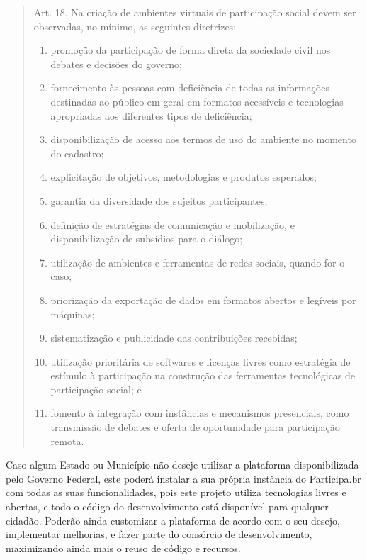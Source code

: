 \documentclass{article}
\begin{document}
\begin{quote}
Art. 18.  Na criação de ambientes virtuais de participação social devem ser
observadas, no mínimo, as seguintes diretrizes:

\begin{enumerate}
  \item promoção da participação de forma direta da sociedade civil nos debates e decisões do governo;
  \item fornecimento às pessoas com deficiência de todas as informações destinadas ao público em geral em formatos acessíveis e tecnologias apropriadas aos diferentes tipos de deficiência;
  \item disponibilização de acesso aos termos de uso do ambiente no momento do cadastro;
  \item explicitação de objetivos, metodologias e produtos esperados;
  \item garantia da diversidade dos sujeitos participantes;
  \item definição de estratégias de comunicação e mobilização, e disponibilização de subsídios para o diálogo;
  \item utilização de ambientes e ferramentas de redes sociais, quando for o caso;
  \item priorização da exportação de dados em formatos abertos e legíveis por máquinas;
  \item sistematização e publicidade das contribuições recebidas;
  \item utilização prioritária de softwares e licenças livres como estratégia de estímulo à participação na construção das ferramentas tecnológicas de participação social; e
  \item fomento à integração com instâncias e mecanismos presenciais, como transmissão de debates e oferta de oportunidade para participação remota.
\end{enumerate}

\end{quote}


Caso algum Estado ou Município não deseje utilizar a plataforma disponibilizada
pelo Governo Federal, este poderá instalar a sua própria instância do
Participa.br com todas as suas funcionalidades, pois este projeto utiliza
tecnologias livres e abertas, e todo o código do desenvolvimento está
disponível para qualquer cidadão. Poderão ainda customizar a plataforma de
acordo com o seu desejo, implementar melhorias, e fazer parte do consórcio de
desenvolvimento, maximizando ainda mais o reuso de código e recursos.
\end{document}
